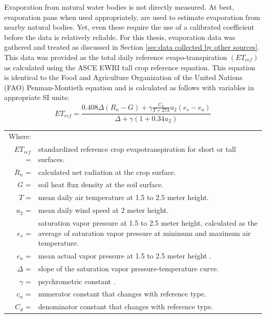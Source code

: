 \begin{linenumbers}
Evaporation from natural water bodies is not directly measured. At best, evaporation pans when used appropriately, are used to estimate evaporation from nearby natural bodies.  Yet, even these require the use of a calibrated coefficient before the data is relatively reliable.  For this thesis, evaporation data was gathered and treated as discussed in Section \ref{sec:data collected by other sources}.  This data was provided as the total daily reference evapo-transpiration $ \left( ET_{ref} \right) $ as calculated using the ASCE EWRI tall crop reference equation.  This equation is identical to the Food and Agriculture Organization of the United Nations (FAO) Penman-Montieth equation \parencite{walter2000asce,FAO56} and is calculated as follows with variables in appropriate SI units:
\begin{equation}
\label{eq:ET}
	ET_{ref}=\frac{0.408\Delta(R_n-G)+\gamma \displaystyle \frac{C_n}{T+273}u_2(e_s-e_a)}{\Delta+\gamma(1+0.34u_2)}
\end{equation}
\begin{tabular}{r p{5.5in}}
Where: &\\
$ET_{ref}$ =&standardized reference crop evapotranspiration for short or tall surfaces. \\
$R_n$ =&calculated net radiation at the crop surface. \\
$G$ =&soil heat flux density at the soil surface. \\
$T$ =&mean daily air temperature at 1.5 to 2.5 meter height. \\
$u_2$ =&mean daily wind speed at 2 meter height. \\
$e_s$ =&saturation vapor pressure at 1.5 to 2.5 meter height, calculated as the
average of saturation vapor pressure at minimum and maximum air temperature. \\
$e_a$ =&mean actual vapor pressure at 1.5 to 2.5 meter height . \\
$\Delta$ =&slope of the saturation vapor pressure-temperature curve. \\
$\gamma$ =&psychrometric constant . \\
$c_n$ =&numerator constant that changes with reference type. \\
$C_d$ =&denominator constant that changes with reference type. \\
\end{tabular}\\


\end{linenumbers}
